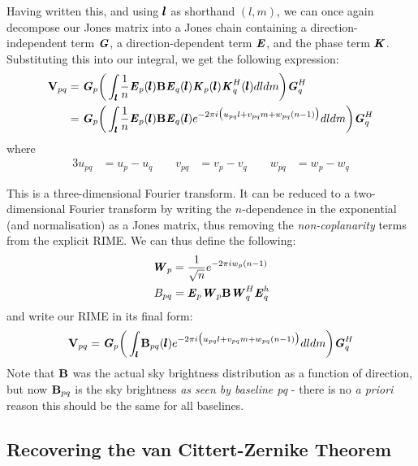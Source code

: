 \pg
Having written this, and using $\pmb{l}$ as shorthand $(l,m)$, we can once again decompose our Jones matrix into a Jones chain containing a direction-independent term $\textbf{\emph{G}}$, a direction-dependent term $\textbf{\emph{E}}$, and the phase term $\textbf{\emph{K}}$. Substituting this into our integral, we get the following expression:
\begin{align}
\textbf{V}_{pq} &= \textbf{\emph{G}}_p \bigg(\int_{\pmb{l}} \frac{1}{n} \textbf{\emph{E}}_p(\pmb{l}) \textbf{B} \textbf{\emph{E}}_q(\pmb{l}) \textbf{\emph{K}}_p(\pmb{l})\textbf{\emph{K}}_q^H(\pmb{l}) dl dm \bigg) \textbf{\emph{G}}_q^H\\
          &= \textbf{\emph{G}}_p \bigg(\int_{\pmb{l}} \frac{1}{n} \textbf{\emph{E}}_p(\pmb{l}) \textbf{B} \textbf{\emph{E}}_q(\pmb{l}) e^{-2\pi i\big(u_{pq}l+v_{pq}m+w_{pq}(n-1)\big)} dl dm \bigg) \textbf{\emph{G}}_q^H
\end{align}
where
\begin{alignat}{3}
u_{pq}&=u_p-u_q \qquad v_{pq}&=v_p-v_q \qquad w_{pq}&=w_p-w_q
\end{alignat}

\pg
This is a three-dimensional Fourier transform. It can be reduced to a two-dimensional Fourier transform by writing the $n$-dependence in the exponential (and normalisation) as a Jones matrix, thus removing the \emph{non-coplanarity} terms from the explicit RIME. We can thus define the following:
\begin{align}
\textbf{\emph{W}}_p &= \frac{1}{\sqrt{n}}e^{-2\pi i w_p(n-1)}\\
B_{pq}    &= \textbf{\emph{E}}_p \textbf{\emph{W}}_p \textbf{B} \textbf{\emph{W}}_q^H \textbf{\emph{E}}_q^h
\end{align}
and write our RIME in its final form:
\begin{equation}\label{eq.vis.FT.coherency.matrix}
\textbf{V}_{pq} = \textbf{\emph{G}}_p \bigg(\int_{\pmb{l}} \textbf{B}_{pq}(\pmb{l}) e^{-2\pi i\big(u_{pq}l+v_{pq}m+w_{pq}(n-1)\big)} dl dm \bigg) \textbf{\emph{G}}_q^H
\end{equation}
\pg
Note that $\textbf{B}$ was the actual sky  brightness distribution as a function of direction, but now $\textbf{B}_{pq}$ is the sky brightness \emph{as seen by baseline pq} - there is no \emph{a priori} reason this should be the same for all baselines.\\

\subsection{Recovering the van Cittert-Zernike Theorem}
\label{section.RIME.FullSky.CVZ}

